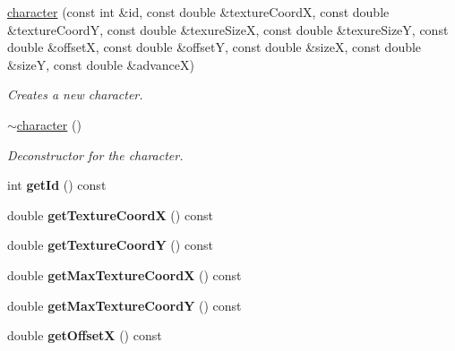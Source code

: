 \begin{DoxyCompactItemize}
\item 
\hyperlink{classflounder_1_1character_ae258dfe0dc5ac451346ceca6b0ff6647}{character} (const int \&id, const double \&texture\+CoordX, const double \&texture\+CoordY, const double \&texure\+SizeX, const double \&texure\+SizeY, const double \&offsetX, const double \&offsetY, const double \&sizeX, const double \&sizeY, const double \&advanceX)
\begin{DoxyCompactList}\small\item\em Creates a new character. \end{DoxyCompactList}\item 
\hyperlink{classflounder_1_1character_a0d67c2d619b0f138c54381428df5a32e}{$\sim$character} ()
\begin{DoxyCompactList}\small\item\em Deconstructor for the character. \end{DoxyCompactList}\item 
\mbox{\label{classflounder_1_1character_ae42232768011b10cc7866f9981cd9b95}} 
int {\bfseries get\+Id} () const
\item 
\mbox{\label{classflounder_1_1character_ad63d095d8b23b48c1a3844bfcbf8f599}} 
double {\bfseries get\+Texture\+CoordX} () const
\item 
\mbox{\label{classflounder_1_1character_acc080516b920d2004439926e04f4c9dd}} 
double {\bfseries get\+Texture\+CoordY} () const
\item 
\mbox{\label{classflounder_1_1character_adbb2dfc7795d330b95c94c1b59882df7}} 
double {\bfseries get\+Max\+Texture\+CoordX} () const
\item 
\mbox{\label{classflounder_1_1character_aa3bb4c6e1e080b33558187ce152d01da}} 
double {\bfseries get\+Max\+Texture\+CoordY} () const
\item 
\mbox{\label{classflounder_1_1character_a71d7519a0f746d1594544782dc300cd9}} 
double {\bfseries get\+OffsetX} () const
\item 
\mbox{\label{classflounder_1_1character_af814c678bdb4daf7144cce8872c539b2}} 

\end{DoxyCompactItemize}

